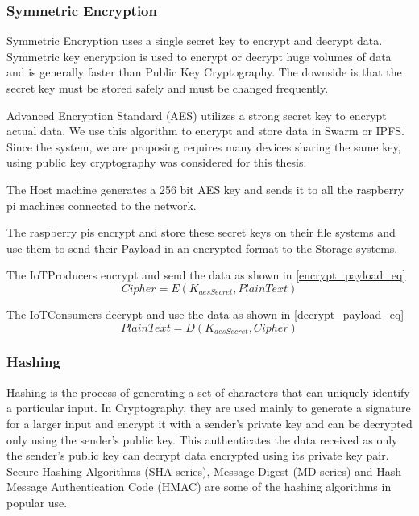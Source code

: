 \documentclass[11pt,openright]{report}
\begin{document}
\subsubsection{Symmetric Encryption}
Symmetric Encryption uses a single secret key to encrypt and decrypt data. Symmetric key encryption is used to encrypt or decrypt huge volumes of data and is generally faster than Public Key Cryptography. The downside is that the secret key must be stored safely and must be changed frequently.

Advanced Encryption Standard (AES) utilizes a strong secret key to encrypt actual data. We use this algorithm to encrypt and store data in Swarm or IPFS. Since the system, we are proposing requires many devices sharing the same key, using public key cryptography was considered for this thesis.

The Host machine generates a 256 bit AES key and sends it to all the raspberry pi machines connected to the network.

The raspberry pis encrypt and store these secret keys on their file systems and use them to send their Payload in an encrypted format to the Storage systems.

The IoTProducers encrypt and send the data as shown in \ref{encrypt_payload_eq}
\begin{equation}\label{encrypt_payload_eq}
    Cipher = E(K_{aesSecret}, PlainText)
\end{equation}

The IoTConsumers decrypt and use the data as shown in \ref{decrypt_payload_eq}
\begin{equation}\label{decrypt_payload_eq}
    PlainText = D(K_{aesSecret}, Cipher)
\end{equation}

\subsubsection{Hashing}
Hashing is the process of generating a set of characters that can uniquely identify a particular input. In Cryptography, they are used mainly to generate a signature for a larger input and encrypt it with a sender's private key and can be decrypted only using the sender's public key. This authenticates the data received as only the sender's public key can decrypt data encrypted using its private key pair. Secure Hashing Algorithms (SHA series), Message Digest (MD series) and Hash Message Authentication Code (HMAC) are some of the hashing algorithms in popular use.
\end{document}
